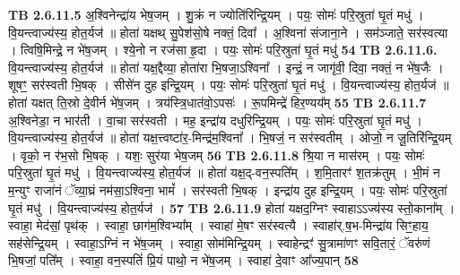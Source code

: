 \documentclass[17pt]{extarticle}
\begin{document}
                                \textbf{ TB 2.6.11.5} \newline
                  अ॒श्विनेन्द्रा॑य भेष॒जम् । शु॒क्रं न ज्योति॑रिन्द्रि॒यम् । पयः॒ सोमः॑ परि॒स्रुता॑ घृ॒तं मधु॑ । वि॒यन्त्वाज्य॑स्य॒ होत॒र्यज॑ ॥ होता॑ यक्षथ् सु॒पेश॑सो॒षे नक्तं॒ दिवा᳚ । अ॒श्विना॑ संजाना॒ने । सम॑ञ्जाते॒ सर॑स्वत्या । त्विषि॒मिन्द्रे॒ न भे॑ष॒जम् । श्ये॒नो न रज॑सा हृ॒दा । पयः॒ सोमः॑ परि॒स्रुता॑ घृ॒तं मधु॑ \textbf{ 54} \newline
                  \newline
                                \textbf{ TB 2.6.11.6.} \newline
                  वि॒यन्त्वाज्य॑स्य॒ होत॒र्यज॑ ॥ होता॑ यक्ष॒द्दैव्या॒ होता॑रा भि॒षजा॒ऽश्विना᳚ । इन्द्रं॒ न जागृ॑वी॒ दिवा॒ नक्तं॒ न भे॑ष॒जैः । शूषꣳ॒॒ सर॑स्वती भि॒षक् । सीसे॑न दुह इन्द्रि॒यम् । पयः॒ सोमः॑ परि॒स्रुता॑ घृ॒तं मधु॑ । वि॒यन्त्वाज्य॑स्य॒ होत॒र्यज॑ ॥ होता॑ यक्षत् ति॒स्रो दे॒वीर्न भे॑ष॒जम् । त्रय॑स्त्रि॒धात॑वो॒ऽपसः॑ । रू॒पमिन्द्रे॑ हिर॒ण्यय᳚म् \textbf{ 55} \newline
                  \newline
                                \textbf{ TB 2.6.11.7} \newline
                  अ॒श्विनेडा॒ न भार॑ती । वा॒चा सर॑स्वती । मह॒ इन्द्रा॑य दधुरिन्द्रि॒यम् । पयः॒ सोमः॑ परि॒स्रुता॑ घृ॒तं मधु॑ । वि॒यन्त्वाज्य॑स्य॒ होत॒र्यज॑ ॥ होता॑ यक्ष॒त्त्वष्टा॑र॒-मिन्द्र॑म॒श्विना᳚ । भि॒षजं॒ न सर॑स्वतीम् । ओजो॒ न जू॒तिरि॑न्द्रि॒यम् । वृको॒ न र॑भ॒सो भि॒षक् । यशः॒ सुर॑या भेष॒जम् \textbf{ 56} \newline
                  \newline
                                \textbf{ TB 2.6.11.8} \newline
                  श्रि॒या न मास॑रम् । पयः॒ सोमः॑ परि॒स्रुता॑ घृ॒तं मधु॑ । वि॒यन्त्वाज्य॑स्य॒ होत॒र्यज॑ ॥ होता॑ यक्ष॒द्-वन॒स्पति᳚म् । श॒मि॒तारꣳ॑ श॒तक्र॑तुम् । भी॒मं न म॒न्युꣳ राजा॑नं ॅव्या॒घ्रं नम॑सा॒ऽश्विना॒ भामं᳚ । सर॑स्वती भि॒षक् । इन्द्रा॑य दुह इन्द्रि॒यम् । पयः॒ सोमः॑ परि॒स्रुता॑ घृ॒तं मधु॑ । वि॒यन्त्वाज्य॑स्य॒ होत॒र्यज॑ । \textbf{ 57} \newline
                  \newline
                                \textbf{ TB 2.6.11.9} \newline
                  होता॑ यक्षद॒ग्निꣳ स्वाहाऽऽज्य॑स्य स्तो॒काना᳚म् । स्वाहा॒ मेद॑सां॒ पृथ॑क् । स्वाहा॒ छाग॑म॒श्विभ्या᳚म् । स्वाहा॑ मे॒षꣳ सर॑स्वत्यै । स्वाहा॑र्.ष॒भ-मिन्द्रा॑य सिꣳ॒॒हाय॒ सह॑सेन्द्रि॒यम् । स्वाहा॒ऽग्निं न भे॑ष॒जम् । स्वाहा॒ सोम॑मिन्द्रि॒यम् । स्वाहेन्द्रꣳ॑ सु॒त्रामा॑णꣳ सवि॒तारं॒ ॅवरु॑णं भि॒षजां॒ पति᳚म् । स्वाहा॒ वन॒स्पतिं॑ प्रि॒यं पाथो॒ न भे॑ष॒जम् । स्वाहा॑ दे॒वाꣳ आ᳚ज्य॒पान् \textbf{ 58} \newline
\end{document}
